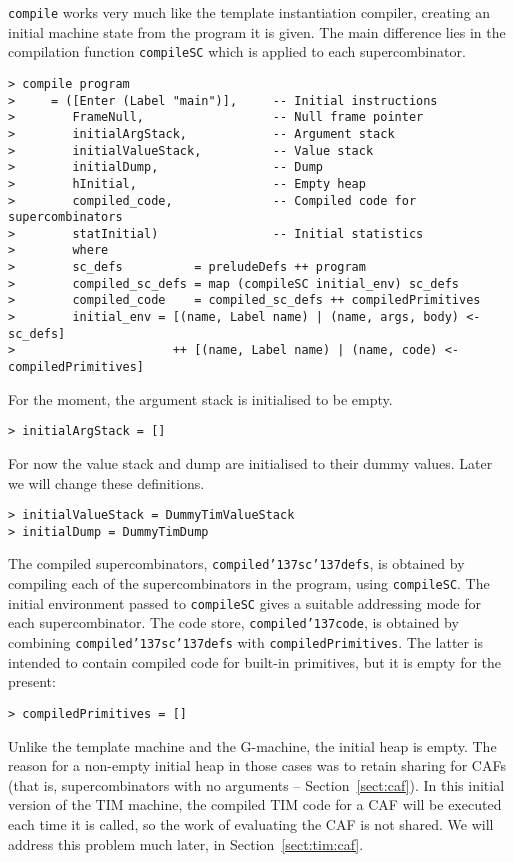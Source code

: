 \mbox{\tt compile} works very much like the template instantiation compiler,
creating an initial machine state from the program it is given.
The main difference lies in the compilation function \mbox{\tt compileSC} which
is applied to each supercombinator.
\begin{verbatim}
> compile program
>     = ([Enter (Label "main")],     -- Initial instructions
>        FrameNull,                  -- Null frame pointer
>        initialArgStack,            -- Argument stack
>        initialValueStack,          -- Value stack
>        initialDump,                -- Dump
>        hInitial,                   -- Empty heap
>        compiled_code,              -- Compiled code for supercombinators
>        statInitial)                -- Initial statistics
>        where
>        sc_defs          = preludeDefs ++ program
>        compiled_sc_defs = map (compileSC initial_env) sc_defs
>        compiled_code    = compiled_sc_defs ++ compiledPrimitives
>        initial_env = [(name, Label name) | (name, args, body) <- sc_defs]
>                      ++ [(name, Label name) | (name, code) <- compiledPrimitives]
\end{verbatim}
%
For the moment, the argument stack is initialised to be empty.
\begin{verbatim}
> initialArgStack = []
\end{verbatim}
%
For now the value stack and dump are initialised to their dummy values. Later
we will change these definitions.
\begin{verbatim}
> initialValueStack = DummyTimValueStack
> initialDump = DummyTimDump
\end{verbatim}
%
%
\par
\sloppy
The compiled supercombinators, \mbox{\tt compiled{\char'137}sc{\char'137}defs}, is obtained by compiling
each of the supercombinators in the program, using \mbox{\tt compileSC}.
The initial environment passed to \mbox{\tt compileSC} gives a suitable addressing
mode for each supercombinator.
The code store, \mbox{\tt compiled{\char'137}code}, is obtained by combining \mbox{\tt compiled{\char'137}sc{\char'137}defs}
with \mbox{\tt compiledPrimitives}.  The latter is intended to contain compiled
code for built-in primitives, but it is empty for the present:
\begin{verbatim}
> compiledPrimitives = []
\end{verbatim}
%
Unlike the template machine and the G-machine, the initial heap is empty.
The reason for a non-empty initial heap in those cases was to retain sharing
for CAFs (that is, supercombinators with no arguments
-- Section~\ref{sect:caf}).
In this initial version of the TIM machine, the compiled TIM code for a CAF
will be executed each time it is called, so the work
of evaluating the CAF is not shared.  We will address this problem much later,
in Section~\ref{sect:tim:caf}.


